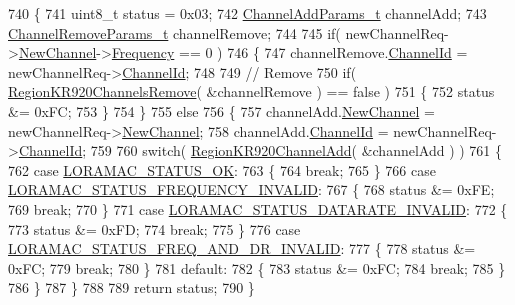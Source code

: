 \begin{DoxyCode}
740 \{
741     uint8\_t status = 0x03;
742     \mbox{\hyperlink{structs_channel_add_params}{ChannelAddParams\_t}} channelAdd;
743     \mbox{\hyperlink{structs_channel_remove_params}{ChannelRemoveParams\_t}} channelRemove;
744 
745     \textcolor{keywordflow}{if}( newChannelReq->\mbox{\hyperlink{structs_new_channel_req_params_afc31493a105479490228fd896b20b45c}{NewChannel}}->\mbox{\hyperlink{structs_channel_params_ade3d190636488dad9a89b19446b7acf1}{Frequency}} == 0 )
746     \{
747         channelRemove.\mbox{\hyperlink{structs_channel_remove_params_ae23f953dc29c360e56a3c856404a3276}{ChannelId}} = newChannelReq->\mbox{\hyperlink{structs_new_channel_req_params_ab072d8ed1ab01d956d5b86a9d0185c3f}{ChannelId}};
748 
749         \textcolor{comment}{// Remove}
750         \textcolor{keywordflow}{if}( \mbox{\hyperlink{group___r_e_g_i_o_n_k_r920_gaada1222081dd856fe052d63f94bb78dd}{RegionKR920ChannelsRemove}}( &channelRemove ) == \textcolor{keyword}{false} )
751         \{
752             status &= 0xFC;
753         \}
754     \}
755     \textcolor{keywordflow}{else}
756     \{
757         channelAdd.\mbox{\hyperlink{structs_channel_add_params_afc31493a105479490228fd896b20b45c}{NewChannel}} = newChannelReq->\mbox{\hyperlink{structs_new_channel_req_params_afc31493a105479490228fd896b20b45c}{NewChannel}};
758         channelAdd.\mbox{\hyperlink{structs_channel_add_params_ae23f953dc29c360e56a3c856404a3276}{ChannelId}} = newChannelReq->\mbox{\hyperlink{structs_new_channel_req_params_ab072d8ed1ab01d956d5b86a9d0185c3f}{ChannelId}};
759 
760         \textcolor{keywordflow}{switch}( \mbox{\hyperlink{group___r_e_g_i_o_n_k_r920_gaca1aceccde474cc473e09dc3113ec876}{RegionKR920ChannelAdd}}( &channelAdd ) )
761         \{
762             \textcolor{keywordflow}{case} \mbox{\hyperlink{group___l_o_r_a_m_a_c_gga1d18f26b344040b3ec5c3db662919661a03db5fca052313edb3823c014b653a74}{LORAMAC\_STATUS\_OK}}:
763             \{
764                 \textcolor{keywordflow}{break};
765             \}
766             \textcolor{keywordflow}{case} \mbox{\hyperlink{group___l_o_r_a_m_a_c_gga1d18f26b344040b3ec5c3db662919661ae3ea7b89796aed5a320013d9743b2955}{LORAMAC\_STATUS\_FREQUENCY\_INVALID}}:
767             \{
768                 status &= 0xFE;
769                 \textcolor{keywordflow}{break};
770             \}
771             \textcolor{keywordflow}{case} \mbox{\hyperlink{group___l_o_r_a_m_a_c_gga1d18f26b344040b3ec5c3db662919661aa910e51ef7a7cf64c27dd3ffe5eb9d38}{LORAMAC\_STATUS\_DATARATE\_INVALID}}:
772             \{
773                 status &= 0xFD;
774                 \textcolor{keywordflow}{break};
775             \}
776             \textcolor{keywordflow}{case} \mbox{\hyperlink{group___l_o_r_a_m_a_c_gga1d18f26b344040b3ec5c3db662919661a163a1a739baee13607068af42f2e9d30}{LORAMAC\_STATUS\_FREQ\_AND\_DR\_INVALID}}:
777             \{
778                 status &= 0xFC;
779                 \textcolor{keywordflow}{break};
780             \}
781             \textcolor{keywordflow}{default}:
782             \{
783                 status &= 0xFC;
784                 \textcolor{keywordflow}{break};
785             \}
786         \}
787     \}
788 
789     \textcolor{keywordflow}{return} status;
790 \}
\end{DoxyCode}
